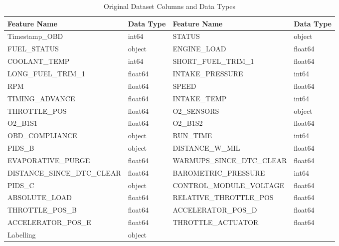 \begin{enumerate}
\begin{table}[H]
    \centering
    \caption{Original Dataset Columns and Data Types}
    \label{tab:dataset_columns}
    \begin{tabular}{|l|l|l|l|}
        \hline
        \textbf{Feature Name} & \textbf{Data Type} & \textbf{Feature Name} & \textbf{Data Type} \\
        \hline
        Timestamp\_OBD            & int64     & STATUS                    & object    \\
        FUEL\_STATUS              & object    & ENGINE\_LOAD               & float64   \\
        COOLANT\_TEMP             & int64     & SHORT\_FUEL\_TRIM\_1       & float64   \\
        LONG\_FUEL\_TRIM\_1       & float64   & INTAKE\_PRESSURE           & int64     \\
        RPM                       & float64   & SPEED                      & float64   \\
        TIMING\_ADVANCE           & float64   & INTAKE\_TEMP               & int64     \\
        THROTTLE\_POS             & float64   & O2\_SENSORS                & object    \\
        O2\_B1S1                  & float64   & O2\_B1S2                   & float64   \\
        OBD\_COMPLIANCE           & object    & RUN\_TIME                  & int64     \\
        PIDS\_B                   & object    & DISTANCE\_W\_MIL           & float64   \\
        EVAPORATIVE\_PURGE        & float64   & WARMUPS\_SINCE\_DTC\_CLEAR & float64   \\
        DISTANCE\_SINCE\_DTC\_CLEAR & float64 & BAROMETRIC\_PRESSURE       & int64     \\
        PIDS\_C                   & object    & CONTROL\_MODULE\_VOLTAGE   & float64   \\
        ABSOLUTE\_LOAD            & float64   & RELATIVE\_THROTTLE\_POS    & float64   \\
        THROTTLE\_POS\_B          & float64   & ACCELERATOR\_POS\_D        & float64   \\
        ACCELERATOR\_POS\_E       & float64   & THROTTLE\_ACTUATOR         & float64   \\
        Labelling                 & object    &                            &           \\
        \hline
    \end{tabular}
\end{table}



\end{enumerate}
